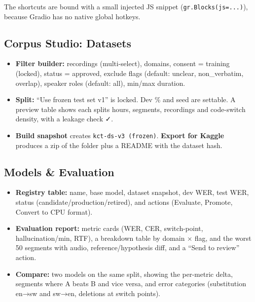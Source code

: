 \documentclass[11pt]{article}
\begin{document}
The shortcuts are bound with a small injected JS snippet (\texttt{gr.\allowbreak{}Blocks(js=\allowbreak{}.\allowbreak{}.\allowbreak{}.\allowbreak{})}), because Gradio has no native global hotkeys.

\hypertarget{corpus-studio-datasets}{%
\subsection{Corpus Studio: Datasets}\label{corpus-studio-datasets}}

\begin{itemize}
\tightlist
\item
  \textbf{Filter builder:} recordings (multi-select), domains, consent = training (locked), status = approved, exclude flags (default: unclear, non\_verbatim, overlap), speaker roles (default: all), min/max duration.
\item
  \textbf{Split:} ``Use frozen test set v1'' is locked. Dev \% and seed are settable. A preview table shows each split\textquotesingle s hours, segments, recordings and code-switch density, with a leakage check ✓.
\item
  \textbf{Build snapshot} creates \texttt{kct-\allowbreak{}ds-\allowbreak{}v3 (frozen)}. \textbf{Export for Kaggle} produces a zip of the folder plus a README with the dataset hash.
\end{itemize}

\hypertarget{models--evaluation}{%
\subsection{Models \& Evaluation}\label{models--evaluation}}

\begin{itemize}
\tightlist
\item
  \textbf{Registry table:} name, base model, dataset snapshot, dev WER, test WER, status (candidate/production/retired), and actions (Evaluate, Promote, Convert to CPU format).
\item
  \textbf{Evaluation report:} metric cards (WER, CER, switch-point, hallucination/min, RTF), a breakdown table by domain × flag, and the worst 50 segments with audio, reference/hypothesis diff, and a ``Send to review'' action.
\item
  \textbf{Compare:} two models on the same split, showing the per-metric delta, segments where A beats B and vice versa, and error categories (substitution en→sw and sw→en, deletions at switch points).
\end{itemize}
\end{document}
